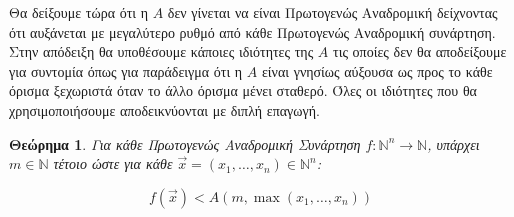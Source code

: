 \documentclass[a4paper, oneside, 11pt]{article}
\newtheorem{thm}{Θεώρημα}
\theoremstyle{definition}
\newcommand{\ora}{\vec}
\begin{document}
Θα δείξουμε τώρα ότι η $A$ δεν γίνεται να είναι Πρωτογενώς Αναδρομική
δείχνοντας ότι αυξάνεται με μεγαλύτερο ρυθμό από κάθε Πρωτογενώς Αναδρομική
συνάρτηση.  Στην απόδειξη θα υποθέσουμε κάποιες ιδιότητες της $A$ τις οποίες
δεν θα αποδείξουμε για συντομία όπως για παράδειγμα ότι η $A$ είναι γνησίως
αύξουσα ως προς το κάθε όρισμα ξεχωριστά όταν το άλλο όρισμα μένει σταθερό.
Όλες οι ιδιότητες που θα χρησιμοποιήσουμε αποδεικνύονται με διπλή επαγωγή.

\begin{thm}
\label{thm5}
Για κάθε Πρωτογενώς Αναδρομική Συνάρτηση $f : \mathbb{N}^n \rightarrow
\mathbb{N}$, υπάρχει $m \in \mathbb{N}$ τέτοιο
ώστε για κάθε $\ora{x} = (x_1, \ldots, x_n) \in \mathbb{N}^n$:

\[ f(\ora{x}) < A(m, \max(x_1, \ldots, x_n) ) \]
\end{thm}
\end{document}
